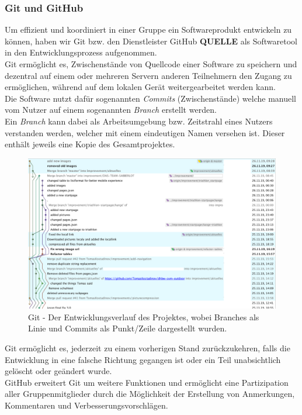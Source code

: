 \documentclass[12pt,a4paper]{article}
\begin{document}
\subsubsection{Git und GitHub}
Um effizient und koordiniert in einer Gruppe ein Softwareprodukt entwickeln zu können, haben wir Git bzw. den Dienstleister GitHub \textbf{QUELLE} als Softwaretool in den Entwicklungsprozess aufgenommen.\\
Git ermöglicht es, Zwischenstände von Quellcode einer Software zu speichern und dezentral auf einem oder mehreren Servern anderen Teilnehmern den Zugang zu ermöglichen, während auf dem lokalen Gerät weitergearbeitet werden kann.\\
Die Software nutzt dafür sogenannten \textit{Commits} (Zwischenstände) welche manuell vom Nutzer auf einem sogenannten \textit{Branch} erstellt werden. \\
Ein \textit{Branch} kann dabei als Arbeitsumgebung bzw. Zeitstrahl eines Nutzers verstanden werden, welcher mit einem eindeutigen Namen versehen ist. Dieser enthält jeweils eine Kopie des Gesamtprojektes.
\begin{figure}[!htbp]
	\includegraphics[scale=0.4]{git.png}
	\caption{Git - Der Entwicklungsverlauf des Projektes, wobei Branches als Linie und Commits als Punkt/Zeile dargestellt wurden.}
	\label{img:git}
\end{figure}
Git ermöglicht es, jederzeit zu einem vorherigen Stand zurückzukehren, falls die Entwicklung in eine falsche Richtung gegangen ist oder ein Teil unabsichtlich gelöscht oder geändert wurde.\\
GitHub erweitert Git um weitere Funktionen und ermöglicht eine Partizipation aller Gruppenmitglieder durch die Möglichkeit der Erstellung von Anmerkungen, Kommentaren und Verbesserungsvorschlägen. 
\end{document}
